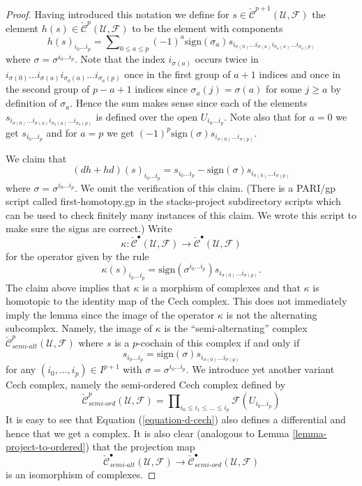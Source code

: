\begin{proof}
\medskip\noindent
Having introduced this notation we define for
$s \in \check{\mathcal{C}}^{p + 1}(\mathcal{U}, \mathcal{F})$
the element $h(s) \in \check{\mathcal{C}}^p(\mathcal{U}, \mathcal{F})$
to be the element with components
\begin{equation}
\label{equation-first-homotopy}
h(s)_{i_0\ldots i_p} =
\sum\nolimits_{0 \leq a \leq p}
(-1)^a \text{sign}(\sigma_a)
s_{i_{\sigma(0)} \ldots i_{\sigma(a)} i_{\sigma_a(a)} \ldots i_{\sigma_a(p)}}
\end{equation}
where $\sigma = \sigma^{i_0 \ldots i_p}$. Note that the index
$i_{\sigma(a)}$ occurs twice in 
$i_{\sigma(0)} \ldots i_{\sigma(a)} i_{\sigma_a(a)} \ldots i_{\sigma_a(p)}$
once in the first group of $a + 1$ indices and once in the second group
of $p - a + 1$ indices since $\sigma_a(j) = \sigma(a)$ for some
$j \geq a$ by definition of $\sigma_a$. Hence the sum makes sense since each
of the elements
$s_{i_{\sigma(0)} \ldots i_{\sigma(a)} i_{\sigma_a(a)} \ldots i_{\sigma_a(p)}}$
is defined over the open $U_{i_0 \ldots i_p}$.
Note also that for $a = 0$ we get $s_{i_0 \ldots i_p}$ and
for $a = p$ we get
$(-1)^p \text{sign}(\sigma) s_{i_{\sigma(0)} \ldots i_{\sigma(p)}}$.

\medskip\noindent
We claim that
$$
(dh + hd)(s)_{i_0 \ldots i_p} =
s_{i_0 \ldots i_p} -
\text{sign}(\sigma) s_{i_{\sigma(0)} \ldots i_{\sigma(p)}}
$$
where $\sigma = \sigma^{i_0 \ldots i_p}$. We omit the verification
of this claim. (There is a PARI/gp script called first-homotopy.gp
in the stacks-project subdirectory scripts which can be used to check
finitely many instances of this claim.
We wrote this script to make sure the signs are correct.)
Write
$$
\kappa :
\check{\mathcal{C}}^\bullet(\mathcal{U}, \mathcal{F})
\longrightarrow
\check{\mathcal{C}}^\bullet(\mathcal{U}, \mathcal{F})
$$
for the operator given by the rule
$$
\kappa(s)_{i_0 \ldots i_p} =
\text{sign}(\sigma^{i_0 \ldots i_p}) s_{i_{\sigma(0)} \ldots i_{\sigma(p)}}.
$$
The claim above implies that $\kappa$ is a morphism of complexes and that
$\kappa$ is homotopic to the identity map of the Cech complex.
This does not immediately imply the lemma since
the image of the operator $\kappa$ is not the alternating subcomplex.
Namely, the image of $\kappa$ is the ``semi-alternating'' complex
$\check{\mathcal{C}}_{semi\text{-}alt}^p(\mathcal{U}, \mathcal{F})$
where $s$ is a $p$-cochain of this complex if and only if
$$
s_{i_0 \ldots i_p} = \text{sign}(\sigma) s_{i_{\sigma(0)} \ldots i_{\sigma(p)}}
$$
for any $(i_0, \ldots, i_p) \in I^{p + 1}$ with
$\sigma = \sigma^{i_0 \ldots i_p}$.
We introduce yet another variant Cech complex, namely the semi-ordered
Cech complex defined by
$$
\check{\mathcal{C}}_{semi\text{-}ord}^p(\mathcal{U}, \mathcal{F})
=
\prod\nolimits_{i_0 \leq i_1 \leq \ldots \leq i_p}
\mathcal{F}(U_{i_0 \ldots i_p})
$$
It is easy to see that Equation (\ref{equation-d-cech}) also defines
a differential and hence that we get a complex. It is also clear
(analogous to Lemma \ref{lemma-project-to-ordered}) that the projection map
$$
\check{\mathcal{C}}_{semi\text{-}alt}^\bullet(\mathcal{U}, \mathcal{F})
\longrightarrow
\check{\mathcal{C}}_{semi\text{-}ord}^\bullet(\mathcal{U}, \mathcal{F})
$$
is an isomorphism of complexes.


\end{proof}
